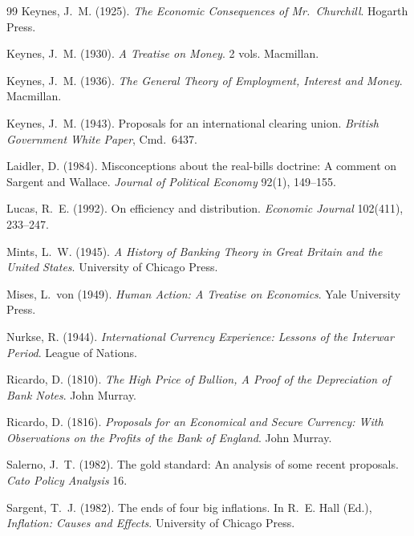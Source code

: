 \documentclass[12pt]{article}
\begin{document}
\begin{thebibliography}{99}
Keynes, J.~M. (1925).
\newblock \textit{The Economic Consequences of Mr.~Churchill}.
\newblock Hogarth Press.

Keynes, J.~M. (1930).
\newblock \textit{A Treatise on Money}. 2 vols.
\newblock Macmillan.

Keynes, J.~M. (1936).
\newblock \textit{The General Theory of Employment, Interest and Money}.
\newblock Macmillan.

Keynes, J.~M. (1943).
\newblock Proposals for an international clearing union.
\newblock \textit{British Government White Paper}, Cmd.\ 6437.

Laidler, D. (1984).
\newblock Misconceptions about the real-bills doctrine: A comment on Sargent
  and Wallace.
\newblock \textit{Journal of Political Economy} 92(1), 149--155.

Lucas, R.~E. (1992).
\newblock On efficiency and distribution.
\newblock \textit{Economic Journal} 102(411), 233--247.

Mints, L.~W. (1945).
\newblock \textit{A History of Banking Theory in Great Britain and the United
  States}.
\newblock University of Chicago Press.

Mises, L.~von (1949).
\newblock \textit{Human Action: A Treatise on Economics}.
\newblock Yale University Press.

Nurkse, R. (1944).
\newblock \textit{International Currency Experience: Lessons of the Interwar
  Period}.
\newblock League of Nations.

Ricardo, D. (1810).
\newblock \textit{The High Price of Bullion, A Proof of the Depreciation of
  Bank Notes}.
\newblock John Murray.

Ricardo, D. (1816).
\newblock \textit{Proposals for an Economical and Secure Currency: With
  Observations on the Profits of the Bank of England}.
\newblock John Murray.

Salerno, J.~T. (1982).
\newblock The gold standard: An analysis of some recent proposals.
\newblock \textit{Cato Policy Analysis} 16.

Sargent, T.~J. (1982).
\newblock The ends of four big inflations.
\newblock In R.~E. Hall (Ed.), \textit{Inflation: Causes and Effects}.
  University of Chicago Press.


\end{thebibliography}
\end{document}
